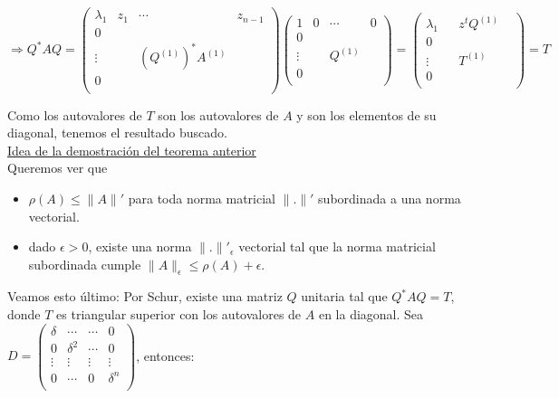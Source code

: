 $$\Rightarrow Q^{*}AQ = 
	\begin{pmatrix}
        \lambda_{1} & z_{1} & \cdots & z_{n - 1}\\
        0 &  &  & \\
        \vdots &  & (Q^{(1)})^{*}A^{(1)} &  \\
        0  &  &  & \\
	\end{pmatrix}
	\begin{pmatrix}
        1 & 0 & \cdots & 0\\
        0 &  &  & \\
        \vdots &  & Q^{(1)} &  \\
        0  &  &  & \\
	\end{pmatrix}
	=
	\begin{pmatrix}
        \lambda_{1} &  & z^{t}Q^{(1)} & \\
        0 &  &  & \\
        \vdots &  & T^{(1)} &  \\
        0  &  &  & \\
	\end{pmatrix}
	= T
$$

Como los autovalores de $T$ son los autovalores de $A$ y son los elementos de su diagonal, tenemos el resultado buscado.\\

\underline{Idea de la demostraci\'on del teorema anterior}\\

Queremos ver que

\begin{itemize}
	\item $\rho(A) \leq \|A\|'$ para toda norma matricial $\|.\|'$ subordinada a una norma vectorial.
	
	\item dado $\epsilon > 0$, existe una norma $\|.\|'_{\epsilon}$ vectorial tal que la norma matricial subordinada cumple $\|A\|_{\epsilon} \leq \rho(A) + \epsilon$.
\end{itemize}

Veamos esto \'ultimo: Por Schur, existe una matriz $Q$ unitaria tal que $Q^{*}AQ = T$, donde $T$ es triangular superior con los autovalores de $A$ en la diagonal. Sea $D = 
	\begin{pmatrix}
        \delta & \cdots & \cdots & 0\\
        0 & \delta^{2} & \cdots & 0\\
        \vdots & \vdots & \vdots & \vdots\\
        0 & \cdots & 0 & \delta^{n}\\
	\end{pmatrix}
$, entonces:

